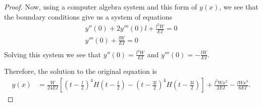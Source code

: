 \begin{proof}
  Now, using a computer algebra system and this form of $y(x)$, we see that the boundary conditions
  give us a system of equations
  \begin{align*}
    y''(0) + 2 y'''(0)l + \frac{l^2W}{EI}  = 0 \\
    y'''(0) + \frac{l W}{EI} = 0 \\
  \end{align*}
  Solving this system we see that $y''(0) = \frac{l^2 W}{EI}$ and $y'''(0) = -\frac{lW}{EI}$.

  Therefore, the solution to the original equation is
  \begin{align*}
    y(x) &= \frac{W}{24 EI} \left[\left(t-\frac{l}{2}\right)^4H\left(t- \frac{l}{2}\right) - \left(t-\frac{3l}{2}\right)^4H\left(t- \frac{3l}{2}\right)\right] + \frac{l^2 W x^2}{2EI} - \frac{l Wx^3}{6EI}.
  \end{align*}

\end{proof}
\newpage
